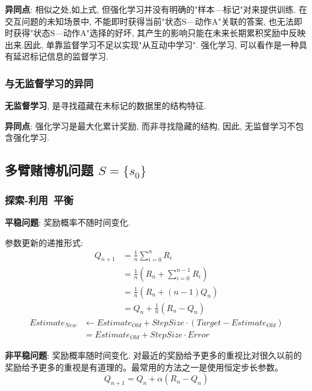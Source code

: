 \documentclass{article}
\begin{document}
            \textbf{异同点}: 相似之处,如上式, 但强化学习并没有明确的"样本---标记"对来提供训练. 在交互问题的未知场景中, 不能即时获得当前"状态S---动作A"关联的答案, 也无法即时获得"状态S---动作A"选择的好坏, 其产生的影响只能在未来长期累积奖励中反映出来.因此, 单靠监督学习不足以实现"从互动中学习". 强化学习, 可以看作是一种具有延迟标记信息的监督学习.
            
            
        
        \subsubsection{与无监督学习的异同}
            \textbf{无监督学习}, 是寻找蕴藏在未标记的数据里的结构特征.

            \textbf{异同点}: 强化学习是最大化累计奖励, 而非寻找隐藏的结构, 因此, 无监督学习不包含强化学习.

        
        
    \subsection{多臂赌博机问题 $S = \{s_0\}$}
        \subsubsection{探索-利用\ 平衡}
        
        \textbf{平稳问题}: 奖励概率不随时间变化.
        
        参数更新的递推形式:
        \begin{align*}
            Q_{n+1} 
            &= \frac{1}{n} \sum_{i = 0}^n R_i\\
            &= \frac{1}{n} (R_n + \sum_{i = 0}^{n-1} R_i)\\
            &= \frac{1}{n} (R_n + (n-1) Q_n)\\
            &= Q_n + \frac{1}{n} (R_n - Q_n)
        \end{align*}
        \begin{align*}
            Estimate_{New} 
            &\gets Estimate_{Old} + StepSize\cdot (Target - Estimate_{Old})\\
            &= Estimate_{Old} + StepSize\cdot Error
        \end{align*}
        
        \textbf{非平稳问题}: 奖励概率随时间变化. 对最近的奖励给予更多的重视比对很久以前的奖励给予更多的重视是有道理的。最常用的方法之一是使用恒定步长参数。
            $$Q_{n+1} = Q_n + \alpha (R_n - Q_n)$$
            
\end{document}
